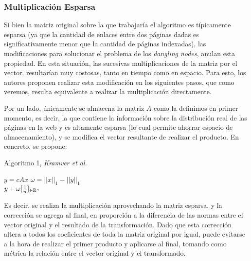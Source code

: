 \subsubsection{Multiplicación Esparsa}
Si bien la matriz original sobre la que trabajaría el algoritmo es típicamente esparsa (ya que la cantidad de enlaces entre dos páginas dadas es significativamente menor que la cantidad de páginas indexadas), las modificaciones para solucionar el problema de los \emph{dangling nodes}, anulan esta propiedad. En esta situación, las sucesivas multiplicaciones de la matriz por el vector, resultarían muy costosas, tanto en tiempo como en espacio. Para esto, los autores proponen realizar esta modificación en los siguientes pasos, que como veremos, resulta equivalente a realizar la multiplicación directamente.

Por un lado, únicamente se almacena la matriz $A$ como la definimos en primer momento, es decir, la que contiene la información sobre la distribución real de las páginas en la web y es altamente esparsa (lo cual permite ahorrar espacio de almacenamiento), y se modifica el vector resultante de realizar el producto.
En concreto, se propone:
\begin{algorithm}
\caption*{Algoritmo 1, \emph{Kramver et al.}}
\begin{algorithmic}
\State $y = cAx$
\State $\omega = ||x||_1 - ||y||_1$\\
\Return $y + \omega [\frac{1}{n}]_{\in \mathbb{R}^n}$

\end{algorithmic}
\end{algorithm}

Es decir, se realiza la multiplicación aprovechando la matriz esparsa, y la corrección se agrega al final, en proporción a la diferencia de las normas entre el vector original y el resultado de la transformación. Dado que esta corrección altera a todos los coeficientes de toda la matriz original por igual, puede evitarse a la hora de realizar el primer producto y aplicarse al final, tomando como métrica la relación entre el vector original y el transformado.


